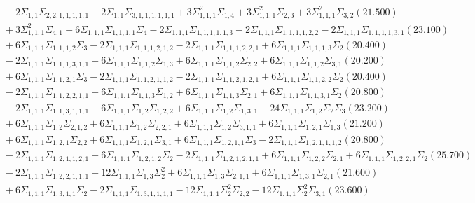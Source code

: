 \documentclass[12pt]{article}
\begin{document}
\begin{landscape}
\begin{align*}
		&\quad\quad -2\Sigma_{1,1}\Sigma_{2,2,1,1,1,1,1}-2\Sigma_{1,1}\Sigma_{3,1,1,1,1,1,1}+3\Sigma_{1,1,1}^{2}\Sigma_{1,4}+3\Sigma_{1,1,1}^{2}\Sigma_{2,3}+3\Sigma_{1,1,1}^{2}\Sigma_{3,2}(21.500) \\ 
		&\quad\quad +3\Sigma_{1,1,1}^{2}\Sigma_{4,1}+6\Sigma_{1,1,1}\Sigma_{1,1,1,1}\Sigma_{4}-2\Sigma_{1,1,1}\Sigma_{1,1,1,1,1,3}-2\Sigma_{1,1,1}\Sigma_{1,1,1,1,2,2}-2\Sigma_{1,1,1}\Sigma_{1,1,1,1,3,1}(23.100) \\ 
		&\quad\quad +6\Sigma_{1,1,1}\Sigma_{1,1,1,2}\Sigma_{3}-2\Sigma_{1,1,1}\Sigma_{1,1,1,2,1,2}-2\Sigma_{1,1,1}\Sigma_{1,1,1,2,2,1}+6\Sigma_{1,1,1}\Sigma_{1,1,1,3}\Sigma_{2}(20.400) \\ 
		&\quad\quad -2\Sigma_{1,1,1}\Sigma_{1,1,1,3,1,1}+6\Sigma_{1,1,1}\Sigma_{1,1,2}\Sigma_{1,3}+6\Sigma_{1,1,1}\Sigma_{1,1,2}\Sigma_{2,2}+6\Sigma_{1,1,1}\Sigma_{1,1,2}\Sigma_{3,1}(20.200) \\ 
		&\quad\quad +6\Sigma_{1,1,1}\Sigma_{1,1,2,1}\Sigma_{3}-2\Sigma_{1,1,1}\Sigma_{1,1,2,1,1,2}-2\Sigma_{1,1,1}\Sigma_{1,1,2,1,2,1}+6\Sigma_{1,1,1}\Sigma_{1,1,2,2}\Sigma_{2}(20.400) \\ 
		&\quad\quad -2\Sigma_{1,1,1}\Sigma_{1,1,2,2,1,1}+6\Sigma_{1,1,1}\Sigma_{1,1,3}\Sigma_{1,2}+6\Sigma_{1,1,1}\Sigma_{1,1,3}\Sigma_{2,1}+6\Sigma_{1,1,1}\Sigma_{1,1,3,1}\Sigma_{2}(20.800) \\ 
		&\quad\quad -2\Sigma_{1,1,1}\Sigma_{1,1,3,1,1,1}+6\Sigma_{1,1,1}\Sigma_{1,2}\Sigma_{1,2,2}+6\Sigma_{1,1,1}\Sigma_{1,2}\Sigma_{1,3,1}-24\Sigma_{1,1,1}\Sigma_{1,2}\Sigma_{2}\Sigma_{3}(23.200) \\ 
		&\quad\quad +6\Sigma_{1,1,1}\Sigma_{1,2}\Sigma_{2,1,2}+6\Sigma_{1,1,1}\Sigma_{1,2}\Sigma_{2,2,1}+6\Sigma_{1,1,1}\Sigma_{1,2}\Sigma_{3,1,1}+6\Sigma_{1,1,1}\Sigma_{1,2,1}\Sigma_{1,3}(21.200) \\ 
		&\quad\quad +6\Sigma_{1,1,1}\Sigma_{1,2,1}\Sigma_{2,2}+6\Sigma_{1,1,1}\Sigma_{1,2,1}\Sigma_{3,1}+6\Sigma_{1,1,1}\Sigma_{1,2,1,1}\Sigma_{3}-2\Sigma_{1,1,1}\Sigma_{1,2,1,1,1,2}(20.800) \\ 
		&\quad\quad -2\Sigma_{1,1,1}\Sigma_{1,2,1,1,2,1}+6\Sigma_{1,1,1}\Sigma_{1,2,1,2}\Sigma_{2}-2\Sigma_{1,1,1}\Sigma_{1,2,1,2,1,1}+6\Sigma_{1,1,1}\Sigma_{1,2,2}\Sigma_{2,1}+6\Sigma_{1,1,1}\Sigma_{1,2,2,1}\Sigma_{2}(25.700) \\ 
		&\quad\quad -2\Sigma_{1,1,1}\Sigma_{1,2,2,1,1,1}-12\Sigma_{1,1,1}\Sigma_{1,3}\Sigma_{2}^{2}+6\Sigma_{1,1,1}\Sigma_{1,3}\Sigma_{2,1,1}+6\Sigma_{1,1,1}\Sigma_{1,3,1}\Sigma_{2,1}(21.600) \\ 
		&\quad\quad +6\Sigma_{1,1,1}\Sigma_{1,3,1,1}\Sigma_{2}-2\Sigma_{1,1,1}\Sigma_{1,3,1,1,1,1}-12\Sigma_{1,1,1}\Sigma_{2}^{2}\Sigma_{2,2}-12\Sigma_{1,1,1}\Sigma_{2}^{2}\Sigma_{3,1}(23.600) \\ 

\end{align*}
\end{landscape}
\end{document}
